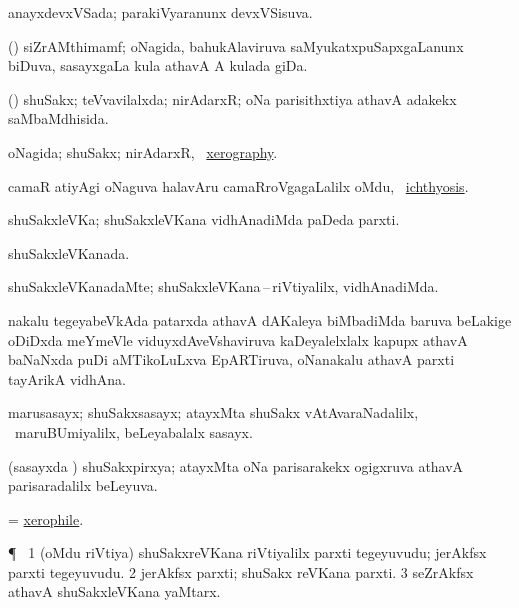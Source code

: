 \bentry
{} 
\gl{\gu} 
\bmng
anayxdevxVSada; parakiVyaranunx devxVSisuva.
\emng
\eentry

\bentry
{} 
\gl{\nA} 
\bmng
(\savi) siZrAMthimamf; oNagida,  bahukAlaviruva saMyukatxpuSapxgaLanunx biDuva, sasayxgaLa kula athavA A  kulada giDa.
\emng  
\eentry

\bentry
{} 
\gl{\gu}  
\bmng
(\pari) shuSakx; teVvavilalxda;  nirAdarxR; oNa parisithxtiya athavA adakekx saMbaMdhisida.
\emng 
\eentry

\bentry
{}  
\gl{\sapUpa}
\bmng
oNagida; shuSakx; nirAdarxR, \udA\ \hyperlink{xerography}{xerography}.
\emng
\eentry

\bentry
{} 
\gl{\nA} 
\bmng
camaR atiyAgi oNaguva halavAru camaRroVgagaLalilx oMdu, \kanmu\ \hyperref{kandict_i.pdf}{I}{ichthyosis}{ichthyosis}.
\emng  
\eentry

\bentry
{}
\gl{\nA}
\bmng
shuSakxleVKa; shuSakxleVKana vidhAnadiMda paDeda parxti.
\emng 
\eentry

\bentry
{} 
\gl{\gu} 
\bmng
shuSakxleVKanada.
\emng
\eentry

\bentry 
{} 
\gl{\kirxvi} 
\bmng
shuSakxleVKanadaMte; shuSakxleVKana\,--\,riVtiyalilx, vidhAnadiMda.
\emng 
\eentry

\bentry
{} 
\gl{\nA} 
\bmng
nakalu tegeyabeVkAda patarxda athavA dAKaleya biMbadiMda  baruva beLakige oDiDxda meYmeVle viduyxdAveVshaviruva kaDeyalelxlalx kapupx athavA baNaNxda puDi aMTikoLuLxva EpARTiruva, oNanakalu athavA parxti tayArikA vidhAna.
\emng 
\eentry

\bentry
{} 
\gl{\nA} 
\bmng
marusasayx; shuSakxsasayx;  atayxMta shuSakx vAtAvaraNadalilx, \kanmu\ maruBUmiyalilx, beLeyabalalx sasayx.
\emng
\eentry

\bentry 
{} 
\gl{\gu} 
\bmng
(sasayxda \vi)  shuSakxpirxya; atayxMta oNa parisarakekx ogigxruva athavA parisaradalilx beLeyuva.
\emng 
\eentry

\bentry
{} 
\gl{\nA} 
\bmng
= \hyperlink{xerophile}{xerophile}.
\emng
\eentry

\bentry
{} 
\gl{\nA} 
\bmng
\P\ 
\bnum
\num{1} (oMdu riVtiya) shuSakxreVKana  riVtiyalilx parxti tegeyuvudu; jerAkfsx parxti tegeyuvudu.
\num{2} jerAkfsx parxti; shuSakx reVKana parxti.  
\num{3} seZrAkfsx  athavA shuSakxleVKana yaMtarx.
\enum
\emng
\eentry

